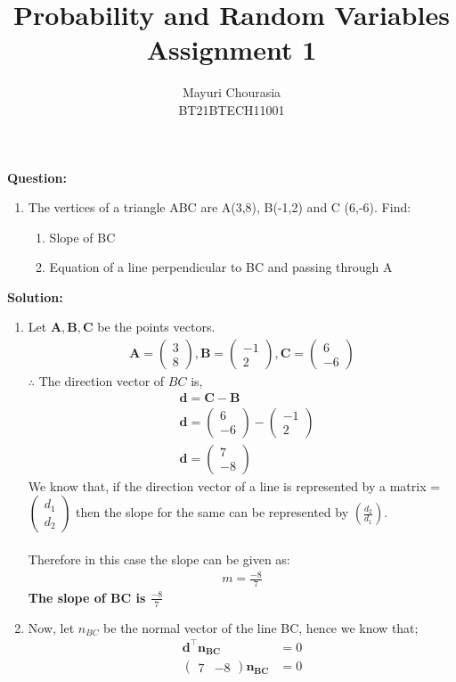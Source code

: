 \documentclass[journal,12pt,twocolumn]{IEEEtran}
\title{Probability and Random Variables\\Assignment 1}
\author{Mayuri Chourasia\\BT21BTECH11001}
\date{}
\let\vec\mathbf
\newcommand{\myvec}[1]{\ensuremath{\begin{pmatrix}#1\end{pmatrix}}}
\newcommand{\question}{\noindent \textbf{Question: }}
\newcommand{\solution}{\noindent \textbf{Solution: }}
\begin{document}
\maketitle
\question
\begin{enumerate}[label=]
\item The vertices of a triangle ABC are A(3,8), B(-1,2) and C (6,-6). Find:
\begin{enumerate}
    \item Slope of BC
    \item Equation of a line perpendicular to BC and passing through A
\end{enumerate}
\end{enumerate}
\solution
\begin{enumerate}
\item Let $\vec{A}, \vec{B}, \vec{C}$ be the points vectors.
	\begin{align}
		\vec{A} = \myvec{3 \\ 8} ,
		\vec{B} = \myvec{-1 \\ 2}  ,
		\vec{C} = \myvec{6 \\ -6}
	\end{align}
	$\therefore$ The direction vector of $BC$ is,
    \begin{align}
    &\vec{d} = \vec{C} - \vec{B}
    \\
	&\vec{d} = \myvec{6 \\ -6} - \myvec{-1 \\ 2}
	\\
	&\vec{d} = \myvec{7 \\ -8}
    \end{align}
    We know that, if the direction vector of a line is represented by a matrix \vec{d}=\myvec{d_1\\d_2} then the slope for the same can be represented by $(\frac{d_2}{d_1})$.\\
    \medskip\\
    Therefore in this case the slope can be given as:
    \begin{align}
        m=\frac{-8}{7}
    \end{align}
    \textbf{The slope of BC is $\frac{-8}{7}$}
    \medskip\\
\item Now, let $n_{BC}$ be the normal vector of the line BC, hence we know that;
    \begin{align}
	\vec{d}^{\top}\vec{n_{BC}} &= 0
	\\
	\myvec{7 & -8}\vec{n_{BC}} &= 0
	\\

\end{align}
\end{enumerate}
\end{document}
